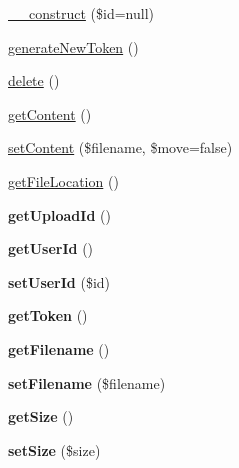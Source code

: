 \begin{DoxyCompactItemize}
\item 
\hyperlink{classUpload_afba84940efd09dcba276b0bceee05f4d}{\_\-\_\-construct} (\$id=null)
\item 
\hyperlink{classUpload_aa3446f1e1b5e1153eec2f26f11bd484e}{generateNewToken} ()
\item 
\hyperlink{classUpload_a5e10f0433b44a7e78f5c2232e3d71aa4}{delete} ()
\item 
\hyperlink{classUpload_a8e8a7b44008c246f9cb524d20848d6c1}{getContent} ()
\item 
\hyperlink{classUpload_a4a6ec727bce54cbe5e60ad19963f4cb4}{setContent} (\$filename, \$move=false)
\item 
\hyperlink{classUpload_aae7c62490598d9dafc488bb9551920b6}{getFileLocation} ()
\item 
\hypertarget{classUpload_aaf7fe1fb2d650ebd9e8a28354d1b23bc}{
{\bfseries getUploadId} ()}
\label{classUpload_aaf7fe1fb2d650ebd9e8a28354d1b23bc}

\item 
\hypertarget{classUpload_aa88e400fdb6da130154a50a03ffcf4fd}{
{\bfseries getUserId} ()}
\label{classUpload_aa88e400fdb6da130154a50a03ffcf4fd}

\item 
\hypertarget{classUpload_a8ee6187abde475afc6bd449317cd8140}{
{\bfseries setUserId} (\$id)}
\label{classUpload_a8ee6187abde475afc6bd449317cd8140}

\item 
\hypertarget{classUpload_af626285758a98e7a63e0aa19dac3ea56}{
{\bfseries getToken} ()}
\label{classUpload_af626285758a98e7a63e0aa19dac3ea56}

\item 
\hypertarget{classUpload_ab9b2fcbe4e5f7214705aef920b26ca5c}{
{\bfseries getFilename} ()}
\label{classUpload_ab9b2fcbe4e5f7214705aef920b26ca5c}

\item 
\hypertarget{classUpload_ab365d84030916cc79ba12b0b1a6b33bf}{
{\bfseries setFilename} (\$filename)}
\label{classUpload_ab365d84030916cc79ba12b0b1a6b33bf}

\item 
\hypertarget{classUpload_ae02afc63dbd24767d5f48caeaa4ebc2d}{
{\bfseries getSize} ()}
\label{classUpload_ae02afc63dbd24767d5f48caeaa4ebc2d}

\item 
\hypertarget{classUpload_a20826cd2af3bc00e5d1e5e19338532c9}{
{\bfseries setSize} (\$size)}
\label{classUpload_a20826cd2af3bc00e5d1e5e19338532c9}


\end{DoxyCompactItemize}
